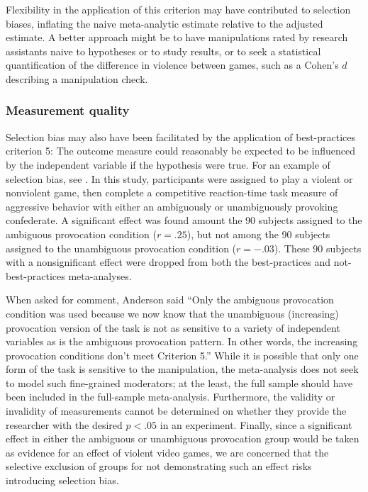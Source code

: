 \documentclass[man]{apa6}
\begin{document}
Flexibility in the application of this criterion may have contributed to selection biases, inflating the naive meta-analytic estimate relative to the adjusted estimate. A better approach might be to have manipulations rated by research assistants naive to hypotheses or to study results, or to seek a statistical quantification of the difference in violence between games, such as a Cohen's $d$ describing a manipulation check.

\subsubsection{Measurement quality}
Selection bias may also have been facilitated by the application of best-practices criterion 5: The outcome measure could reasonably be expected to be influenced by the independent variable if the hypothesis were true. For an example of selection bias, see \citet[study 2]{Anderson:etal:2004}. In this study, participants were assigned to play a violent or nonviolent game, then complete a competitive reaction-time task measure of aggressive behavior with either an ambiguously or unambiguously provoking confederate. A significant effect was found amount the 90  subjects assigned to the ambiguous provocation condition ($r = .25$), but not among the 90 subjects assigned to the unambiguous provocation condition ($r = -.03$). These 90 subjects with a nonsignificant effect were dropped from both the best-practices and not-best-practices meta-analyses. 

When asked for comment, Anderson said ``Only the ambiguous provocation condition was used because we now know that the unambiguous (increasing) provocation version of the task is not as sensitive to a variety of independent variables as is the ambiguous provocation pattern. In other words, the increasing provocation conditions don't meet Criterion 5.'' While it is possible that only one form of the task is sensitive to the manipulation, the meta-analysis does not seek to model such fine-grained moderators; at the least, the full sample should have been included in the full-sample meta-analysis. Furthermore, the validity or invalidity of measurements cannot be determined on whether they provide the researcher with the desired $p < .05$ in an experiment. Finally, since a significant effect in either the ambiguous or unambiguous provocation group would be taken as evidence for an effect of violent video games, we are concerned that the selective exclusion of groups for not demonstrating such an effect risks introducing selection bias.
\end{document}
